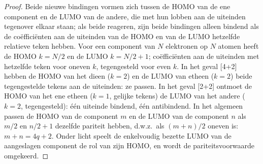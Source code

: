 \begin{proof}
Beide nieuwe bindingen vormen zich tussen de HOMO van de ene component en
de LUMO van de andere, die met hun lobben aan de uiteinden tegenover
elkaar staan; als beide  reageren, zijn beide bindingen
alleen bindend als de coëfficiënten aan de uiteinden van de
HOMO en van de LUMO hetzelfde relatieve teken hebben. Voor een component van $N$
elektronen op $N$ atomen heeft de HOMO $k = N/2$ en de LUMO $k = N/2 + 1$; coëfficiënten aan de uiteinden met
hetzelfde teken voor oneven $k$, tegengesteld voor even $k$. In het geval [4+2] hebben de HOMO van het dieen ($k = 2$)
en de LUMO van etheen ($k = 2$) beide tegengestelde tekens aan de uiteinden: ze passen. In het
geval [2+2] ontmoet de HOMO van het ene etheen ($k = 1$, gelijke tekens) de LUMO van het andere
($k = 2$, tegengesteld): één uiteinde bindend, één antibindend. In het algemeen passen de HOMO van de component $m$
en de LUMO van de component $n$ als $m/2$ en $n/2 + 1$ dezelfde
pariteit hebben, d.w.z.\ als $(m + n)/2$ oneven is: $m + n = 4q + 2$. Onder licht speelt de enkelvoudig bezette LUMO van
de aangeslagen component de rol van zijn HOMO, en wordt de
pariteitsvoorwaarde omgekeerd.
\end{proof}

